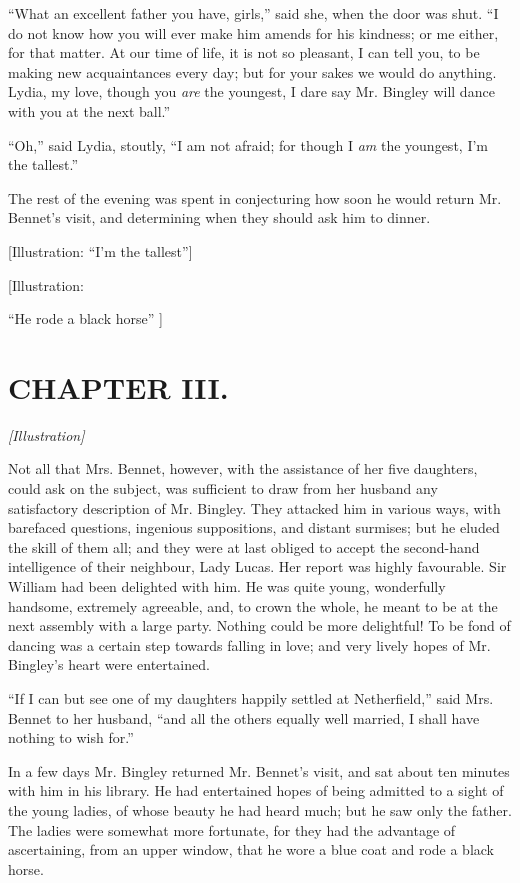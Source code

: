 \documentclass[12pt]{book}
\begin{document}
``What an excellent father you have, girls,'' said she, when the door was shut. ``I do not know how you will ever make him amends for his kindness; or me either, for that matter. At our time of life, it is not so pleasant, I can tell you, to be making new acquaintances every day; but for your sakes we would do anything. Lydia, my love, though you \textit{are} the youngest, I dare say Mr. Bingley will dance with you at the next ball.''

``Oh,'' said Lydia, stoutly, ``I am not afraid; for though I \textit{am} the youngest, I'm the tallest.''

The rest of the evening was spent in conjecturing how soon he would return Mr. Bennet's visit, and determining when they should ask him to dinner.

[Illustration: ``I'm the tallest'']

[Illustration:

``He rode a black horse'' ]

\chapter{CHAPTER III.}

\emph{[Illustration]}

Not all that Mrs. Bennet, however, with the assistance of her five daughters, could ask on the subject, was sufficient to draw from her husband any satisfactory description of Mr. Bingley. They attacked him in various ways, with barefaced questions, ingenious suppositions, and distant surmises; but he eluded the skill of them all; and they were at last obliged to accept the second-hand intelligence of their neighbour, Lady Lucas. Her report was highly favourable. Sir William had been delighted with him. He was quite young, wonderfully handsome, extremely agreeable, and, to crown the whole, he meant to be at the next assembly with a large party. Nothing could be more delightful! To be fond of dancing was a certain step towards falling in love; and very lively hopes of Mr. Bingley's heart were entertained.

``If I can but see one of my daughters happily settled at Netherfield,'' said Mrs. Bennet to her husband, ``and all the others equally well married, I shall have nothing to wish for.''

In a few days Mr. Bingley returned Mr. Bennet's visit, and sat about ten minutes with him in his library. He had entertained hopes of being admitted to a sight of the young ladies, of whose beauty he had heard much; but he saw only the father. The ladies were somewhat more fortunate, for they had the advantage of ascertaining, from an upper window, that he wore a blue coat and rode a black horse.
\end{document}

